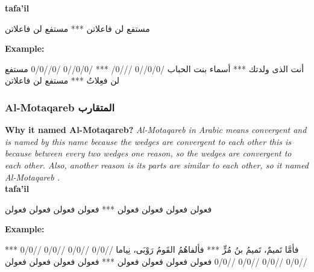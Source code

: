 \textbf{tafa'il}

\begin{Arabic}
  \begin{traditionalpoem*}

    مستفع لن فاعلاتن *** مستفع لن فاعلاتن

	\end{traditionalpoem*}
      \end{Arabic}


\textbf{Example:}

\begin{Arabic}
  \begin{traditionalpoem*}


    أنت الذى ولدتك *** أسماء بنت الحباب
    /0/0//0  ///0/ *** /0/0//0  /0//0/0
    مستفع لن  فعِلاتُ *** مستفع لن فاعلاتن


	\end{traditionalpoem*}
      \end{Arabic}

      \newpage


\subsubsection{Al-Motaqareb \textarabic{المتقارب}}
\textbf{Why it named Al-Motaqareb?}
\textit{Al-Motaqareb in Arabic means convergent and is named by this name because the wedges are convergent to each other this is because between every two wedges one reason, so the wedges are convergent to each other. Also, another reason is its parts are similar to each other, so it named Al-Motaqareb \cite{Alkafi1994}.
}
\\

\textbf{tafa'il}

\begin{Arabic}
  \begin{traditionalpoem*}
    فعولن فعولن فعولن فعولن *** فعولن فعولن فعولن فعولن


	\end{traditionalpoem*}
      \end{Arabic}

\textbf{Example:}

\begin{Arabic}
  \begin{traditionalpoem*}

    فأمَّا تَميمٌ، تَميمُ بنُ مُرٍّ *** فألفاهُمُ القَومُ رَوْبَى، نِياما
    //0/0 //0/0 //0/0 //0/0 *** //0/0 //0/0 //0/0 //0/0
    فعولن فعولن فعولن فعولن *** فعولن فعولن فعولن فعولن




	\end{traditionalpoem*}
      \end{Arabic}


